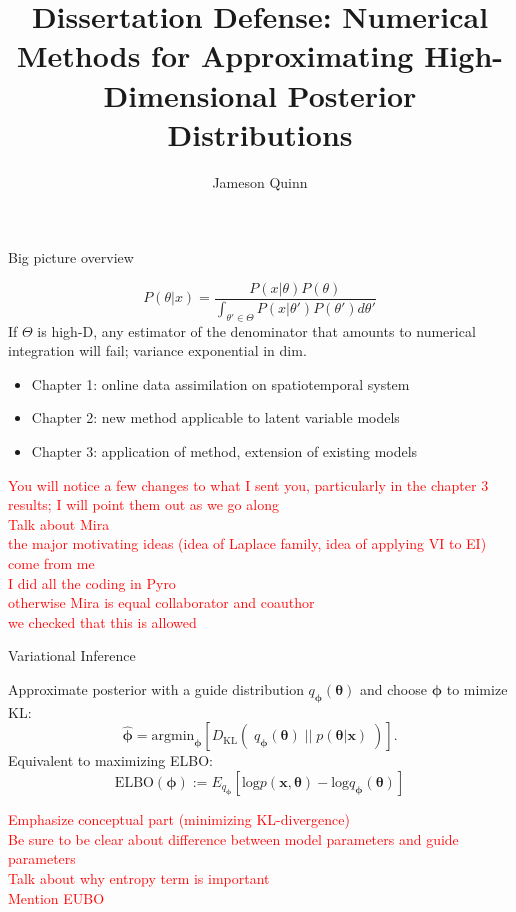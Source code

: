 \documentclass[
  ignorenonframetext,
]{beamer}
\title{Dissertation Defense: Numerical Methods for Approximating
High-Dimensional Posterior Distributions}
\author{Jameson Quinn}
\date{}
\providecommand{\tightlist}{%
  \setlength{\itemsep}{0pt}\setlength{\parskip}{0pt}}
\begin{document}
\frame{\titlepage}

\begin{frame}{Big picture overview}
\protect\hypertarget{big-picture-overview}{}

\[P(\theta|x)=\frac{P(x|\theta)P(\theta)}{\int_{\theta'\in\Theta} P(x|\theta')P(\theta')d\theta'}\]
If \(\Theta\) is high-D, any estimator of the denominator that amounts
to numerical integration will fail; variance exponential in dim.

\begin{itemize}
\tightlist
\item
  Chapter 1: online data assimilation on spatiotemporal system
\item
  Chapter 2: new method applicable to latent variable models
\item
  Chapter 3: application of method, extension of existing models
\end{itemize}

\textcolor{red}{{\scriptsize You will notice a few changes to what I sent you, particularly in the chapter 3 results; I will point them out as we go along\\Talk about Mira\\the major motivating ideas (idea of Laplace family, idea of applying VI to EI) come from me\\I did all the coding in Pyro\\otherwise Mira is equal collaborator and coauthor\\we checked that this is allowed}}

\end{frame}

\begin{frame}{Variational Inference}
\protect\hypertarget{variational-inference}{}

Approximate posterior with a guide distribution
\(q_{\bm{\phi}}(\bm{\theta})\) and choose \(\bm{\phi}\) to mimize KL:
\[\hat{{\bm{\phi}}}=\mathrm{argmin}_{\bm{\phi}}\left[D_{\mathrm{KL}} \left(\;q_{\bm{\phi}}(\bm{\theta})\;\big|\big|\; p(\bm{\theta}|\bm{x})\;\right)\right].\]
Equivalent to maximizing ELBO:
\[\mathrm{ELBO}({\bm{\phi}}):=E_{q_{\bm{\phi}}}
\left[\mathrm{log} p(\bm{x},\bm{\theta})-\mathrm{log} q_{\bm{\phi}}(\bm{\theta})\right]\]

\textcolor{red}{{\scriptsize Emphasize conceptual part (minimizing KL-divergence)\\Be sure to be clear about difference between model parameters and guide parameters\\Talk about why entropy term is important\\Mention EUBO}}

\end{frame}
\end{document}

